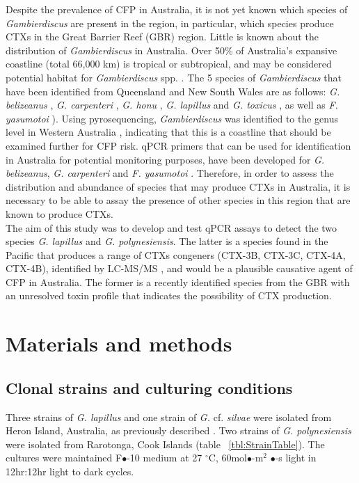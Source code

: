 \documentclass[12pt]{article}
\begin{document}
Despite the prevalence of CFP in Australia, it is not yet known which species of \textit{Gambierdiscus} are present in the region, in particular, which species produce CTXs in the Great Barrier Reef (GBR) region. Little is known about the distribution of \emph{Gambierdiscus} in Australia.
Over 50\% of Australia's expansive coastline (total 66,000 km) is tropical or subtropical, and may be considered potential habitat for \emph{Gambierdiscus} spp. \citep{kretzschmar2016characterization}. 
The 5 species of \emph{Gambierdiscus} that have been identified from Queensland and New South Wales are as follows: \emph{G. belizeanus} \citep{murray2014molecular}, \emph{G. carpenteri} \citep{kohli2014high,sparrow2017effects}, \emph{G. honu} \citep{rhodes2017new}, \emph{G. lapillus} \citep{kretzschmar2016characterization} and \emph{G. toxicus} \citep{hallegraeff2010algae}, as well as \emph{F. yasumotoi}  \citep{murray2014molecular}). Using pyrosequencing, \textit{Gambierdiscus} was identified to the genus level in Western Australia \citep{kohli2014cob}, indicating that this is a coastline that should be examined further for CFP risk. 
qPCR primers that can be used for identification in Australia for potential monitoring purposes, have been developed for \emph{G. belizeanus}, \emph{G. carpenteri} and \emph{F. yasumotoi} \citep{nishimura2016quantitative,vandersea2012development}. Therefore, in order to assess the distribution and abundance of species that may produce CTXs in Australia, it is necessary to be able to assay the presence of other species in this region that are known to produce CTXs.\\ 


The aim of this study was to develop and test qPCR assays to detect the two species \emph{G. lapillus} and \emph{G. polynesiensis}. The latter is a species found in the Pacific that produces a range of CTXs congeners (CTX-3B, CTX-3C, CTX-4A, CTX-4B), identified by LC-MS/MS \citep{rhodes2014production}, and would be a plausible causative agent of CFP in Australia. The former is a recently identified species from the GBR with an unresolved toxin profile that indicates the possibility of CTX production.
\newpage
\section*{Materials and methods}
\subsection*{Clonal strains and culturing conditions}
Three strains of \emph{G. lapillus} 
and one strain of \emph{G.} cf. \emph{silvae} 
were isolated from Heron Island, Australia, as previously described \citep{kretzschmar2016characterization}. Two strains of \emph{G. polynesiensis} were isolated from Rarotonga, Cook Islands (table ~\ref{tbl:StrainTable}). The cultures were maintained F$\bullet$-10 medium at 27 $^{\circ}$C, 60mol$\bullet$-m$^{2}$ $\bullet$-s light in 12hr:12hr light to dark cycles.
\end{document}
